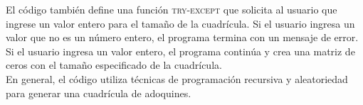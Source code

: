 \documentclass{article}
\begin{document}
El código también define una función \textsc{try-except } que solicita al usuario que ingrese un valor entero para el tamaño de la cuadrícula.
Si el usuario ingresa un valor que no es un número entero, el programa termina con un mensaje de error. Si el usuario ingresa un valor entero,
el programa continúa y crea una matriz de ceros con el tamaño especificado de la cuadrícula.\\

En general, el código utiliza técnicas de programación recursiva y aleatoriedad para generar una cuadrícula de adoquines.
\end{document}
